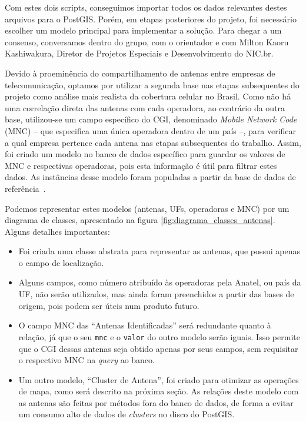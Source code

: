 \documentclass[]{politex}
\begin{document}
Com estes dois scripts, conseguimos importar todos os dados relevantes destes
arquivos para o PostGIS. Porém, em etapas posteriores do projeto, foi necessário
escolher um modelo principal para implementar a solução. Para chegar a um
consenso, conversamos dentro do grupo, com o orientador e com Milton Kaoru
Kashiwakura, Diretor de Projetos Especiais e Desenvolvimento do NIC.br.

Devido à proeminência do compartilhamento de antenas entre empresas de
telecomunicação, optamos por utilizar a segunda base nas etapas subsequentes do
projeto como análise mais realista da cobertura celular no Brasil. Como não há
uma correlação direta das antenas com cada operadora, ao contrário da outra
base, utilizou-se um campo específico do CGI, denominado \textit{Mobile Network
Code} (MNC) -- que especifica uma única operadora dentro de um país --, para
verificar a qual empresa pertence cada antena nas etapas subsequentes do
trabalho. Assim, foi criado um modelo no banco de dados específico para guardar
os valores de MNC e respectivas operadoras, pois esta informação é útil para
filtrar estes dados. As instâncias desse modelo foram populadas a partir da base
de dados de referência~\cite{mcc-mnc}.

Podemos representar estes modelos (antenas, UFs, operadoras e MNC) por um
diagrama de classes, apresentado na figura \ref{fig:diagrama_classes_antenas}.
Alguns detalhes importantes:

\begin{itemize}

\item Foi criada uma classe abstrata para representar as antenas, que possui
apenas o campo de localização.

\item Alguns campos, como número atribuído às operadoras pela Anatel, ou país da
UF, não serão utilizados, mas ainda foram preenchidos a partir das bases de
origem, pois podem ser úteis num produto futuro.

\item O campo MNC das ``Antenas Identificadas'' será redundante quanto à
relação, já que o seu \texttt{mnc} e o \texttt{valor} do outro modelo serão
iguais. Isso permite que o CGI dessas antenas seja obtido apenas por seus
campos, sem requisitar o respectivo MNC na \textit{query} ao banco.

\item Um outro modelo, ``Cluster de Antena'', foi criado para otimizar as
operações de mapa, como será descrito na próxima seção. As relações deste modelo
com as antenas são feitas por métodos fora do banco de dados, de forma a evitar
um consumo alto de dados de \textit{clusters} no disco do PostGIS.

\end{itemize}
\end{document}
